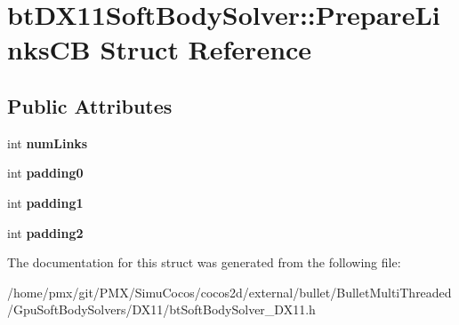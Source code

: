 \hypertarget{structbtDX11SoftBodySolver_1_1PrepareLinksCB}{}\section{bt\+D\+X11\+Soft\+Body\+Solver\+:\+:Prepare\+Links\+CB Struct Reference}
\label{structbtDX11SoftBodySolver_1_1PrepareLinksCB}
\subsection*{Public Attributes}
\begin{DoxyCompactItemize}
\item 
\mbox{\label{structbtDX11SoftBodySolver_1_1PrepareLinksCB_af79f89e1994a9fe4473e39f2e8aee8dd}} 
int {\bfseries num\+Links}
\item 
\mbox{\label{structbtDX11SoftBodySolver_1_1PrepareLinksCB_aa4b6a7136d7cafb63f6ffc7b4ebbe65b}} 
int {\bfseries padding0}
\item 
\mbox{\label{structbtDX11SoftBodySolver_1_1PrepareLinksCB_a9c6f7e3c1280edd206b751d3b5189e5c}} 
int {\bfseries padding1}
\item 
\mbox{\label{structbtDX11SoftBodySolver_1_1PrepareLinksCB_a460d516c30cb8e7ad9165dc6652bebc3}} 
int {\bfseries padding2}
\end{DoxyCompactItemize}


The documentation for this struct was generated from the following file\+:\begin{DoxyCompactItemize}
\item 
/home/pmx/git/\+P\+M\+X/\+Simu\+Cocos/cocos2d/external/bullet/\+Bullet\+Multi\+Threaded/\+Gpu\+Soft\+Body\+Solvers/\+D\+X11/bt\+Soft\+Body\+Solver\+\_\+\+D\+X11.\+h\end{DoxyCompactItemize}
